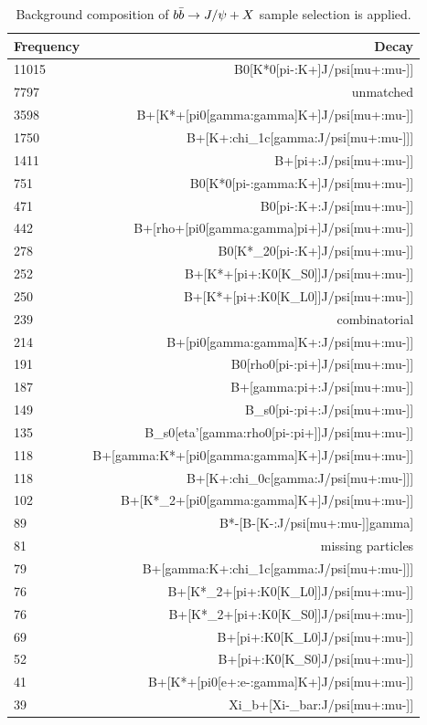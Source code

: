 \begin{table}[ht]
    \centering
    \begin{tabular}{| l | r |}
	\hline
	Frequency & Decay\\ 
	\hline
	11015 & B0[K*0[pi-:K+]J/psi[mu+:mu-]] \\ 
	7797 & unmatched \\ 
	3598 & B+[K*+[pi0[gamma:gamma]K+]J/psi[mu+:mu-]] \\ 
	1750 & B+[K+:chi\_1c[gamma:J/psi[mu+:mu-]]] \\ 
	1411 & B+[pi+:J/psi[mu+:mu-]] \\ 
	751 & B0[K*0[pi-:gamma:K+]J/psi[mu+:mu-]] \\ 
	471 & B0[pi-:K+:J/psi[mu+:mu-]] \\ 
	442 & B+[rho+[pi0[gamma:gamma]pi+]J/psi[mu+:mu-]] \\ 
	278 & B0[K*\_20[pi-:K+]J/psi[mu+:mu-]] \\ 
	252 & B+[K*+[pi+:K0[K\_S0]]J/psi[mu+:mu-]] \\ 
	250 & B+[K*+[pi+:K0[K\_L0]]J/psi[mu+:mu-]] \\ 
	239 & combinatorial \\ 
	214 & B+[pi0[gamma:gamma]K+:J/psi[mu+:mu-]] \\ 
	191 & B0[rho0[pi-:pi+]J/psi[mu+:mu-]] \\ 
	187 & B+[gamma:pi+:J/psi[mu+:mu-]] \\ 
	149 & B\_s0[pi-:pi+:J/psi[mu+:mu-]] \\ 
	135 & B\_s0[eta'[gamma:rho0[pi-:pi+]]J/psi[mu+:mu-]] \\ 
	118 & B+[gamma:K*+[pi0[gamma:gamma]K+]J/psi[mu+:mu-]] \\ 
	118 & B+[K+:chi\_0c[gamma:J/psi[mu+:mu-]]] \\ 
	102 & B+[K*\_2+[pi0[gamma:gamma]K+]J/psi[mu+:mu-]] \\ 
	89 & B*-[B-[K-:J/psi[mu+:mu-]]gamma] \\ 
	81 & missing particles \\ 
	79 & B+[gamma:K+:chi\_1c[gamma:J/psi[mu+:mu-]]] \\ 
	76 & B+[K*\_2+[pi+:K0[K\_L0]]J/psi[mu+:mu-]] \\ 
	76 & B+[K*\_2+[pi+:K0[K\_S0]]J/psi[mu+:mu-]] \\ 
	69 & B+[pi+:K0[K\_L0]J/psi[mu+:mu-]] \\ 
	52 & B+[pi+:K0[K\_S0]J/psi[mu+:mu-]] \\ 
	41 & B+[K*+[pi0[e+:e-:gamma]K+]J/psi[mu+:mu-]] \\ 
	39 & Xi\_b+[Xi-\_bar:J/psi[mu+:mu-]] \\ 
	\hline
    \end{tabular}
    \caption{Background composition of $b\bar{b}\rightarrow J/\psi+X$ sample selection is applied.}
    \label{tbl:bplus_bckg_selection}
\end{table}

